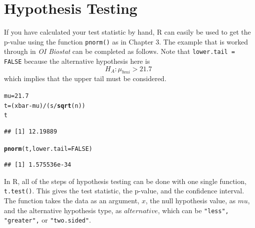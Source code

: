 \documentclass{report}\usepackage[]{graphicx}\usepackage[]{color}
\makeatletter
\newcommand{\hlnum}[1]{\textcolor[rgb]{0.686,0.059,0.569}{#1}}%
\newcommand{\hlopt}[1]{\textcolor[rgb]{0,0,0}{#1}}%
\newcommand{\hlstd}[1]{\textcolor[rgb]{0.345,0.345,0.345}{#1}}%
\newcommand{\hlkwb}[1]{\textcolor[rgb]{0.69,0.353,0.396}{#1}}%
\newcommand{\hlkwc}[1]{\textcolor[rgb]{0.333,0.667,0.333}{#1}}%
\newcommand{\hlkwd}[1]{\textcolor[rgb]{0.737,0.353,0.396}{\textbf{#1}}}%
\newenvironment{kframe}{%
 \def\at@end@of@kframe{}%
 \ifinner\ifhmode%
  \def\at@end@of@kframe{\end{minipage}}%
  \begin{minipage}{\columnwidth}%
 \fi\fi%
 \def\FrameCommand##1{\hskip\@totalleftmargin \hskip-\fboxsep
 \colorbox{shadecolor}{##1}\hskip-\fboxsep
     \hskip-\linewidth \hskip-\@totalleftmargin \hskip\columnwidth}%
 \MakeFramed {\advance\hsize-\width
   \@totalleftmargin\z@ \linewidth\hsize
   \@setminipage}}%
 {\par\unskip\endMakeFramed%
 \at@end@of@kframe}
\newenvironment{knitrout}{}{} %
\makeatother
\begin{document}
\section{Hypothesis Testing}
If you have calculated your test statistic by hand, \textsf{R} can easily be used to get the p-value using the function \texttt{pnorm()} as in Chapter 3.  The example that is worked through in \textit{OI Biostat} can be completed as follows.  Note that \texttt{lower.tail = FALSE} because the alternative hypothesis here is 
\[ H_A: \mu_{bmi} > 21.7 \]
which implies that the upper tail must be considered.  
\begin{knitrout}
\color{fgcolor}\begin{kframe}
\begin{alltt}
\hlstd{mu} \hlkwb{=} \hlnum{21.7}
\hlstd{t} \hlkwb{=} \hlstd{(xbar} \hlopt{-} \hlstd{mu)}\hlopt{/}\hlstd{(s}\hlopt{/}\hlkwd{sqrt}\hlstd{(n))}
\hlstd{t}
\end{alltt}
\begin{verbatim}
## [1] 12.19889
\end{verbatim}
\begin{alltt}
\hlkwd{pnorm}\hlstd{(t,} \hlkwc{lower.tail} \hlstd{=} \hlnum{FALSE}\hlstd{)}
\end{alltt}
\begin{verbatim}
## [1] 1.575536e-34
\end{verbatim}
\end{kframe}
\end{knitrout}

In \textsf{R}, all of the steps of hypothesis testing can be done with one single function, \texttt{t.test()}.  This gives the test statistic, the p-value, and the confidence interval.  The function takes the data as an argument, $x$, the null hypothesis value, as $mu$, and the alternative hypothesis type, as $alternative$, which can be \texttt{"less", "greater",} or \texttt{"two.sided"}.  
\end{document}

